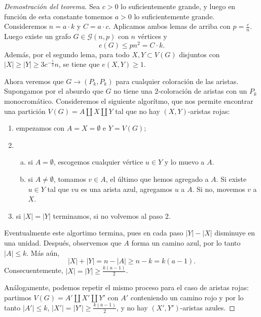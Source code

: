 \documentclass[12pt]{report}
\theoremstyle{plain}
\theoremstyle{definition}
\newcommand{\abs}[1]{\left \vert #1 \right \vert}
\begin{document}
\begin{proof}[Demostración del teorema]
Sea $c > 0$ lo suficientemente grande, y luego en función de esta constante tomemos $a>0$ lo suficientemente grande. Consideremos $n = a \cdot k$ y $C = a \cdot c$. Aplicamos ambos lemas de arriba con $p = \frac c n$. Luego existe un grafo $G \in \mathcal G (n,p)$ con $n$ vértices y
\[
    e(G) \leq pn^2 = C \cdot k  .
\]
Además, por el segundo lema, para todo $X,Y \subset V(G)$ disjuntos con $\abs X \geq \abs Y \geq 3 c^{- \frac 1 2}n$, se tiene que $e(X,Y) \geq 1$.

Ahora veremos que $G \longrightarrow (P_k, P_k)$ para cualquier coloración de las aristas. Supongamos por el absurdo que $G$ no tiene una $2$-coloración de aristas con un $P_k$ monocromático. Consideremos el siguiente algorítmo, que nos permite encontrar una partición $V(G) = A \coprod X \coprod Y$ tal que no hay $(X,Y)$-aristas rojas:
\begin{enumerate}
\item empezamos con $A = X = \emptyset$ e $Y = V(G)$;
\item
\begin{enumerate}[(a)]
\item si $A = \emptyset$, escogemos cualquier vértice $u \in Y$ y lo muevo a $A$.
\item si $A \neq \emptyset$, tomamos $v \in A$, el último que hemos agregado a $A$. Si existe $u \in Y$ tal que $v u$ es una arista azul, agregamos $u$ a $A$. Si no, movemos $v$ a $X$.
\end{enumerate}
\item si $\abs X = \abs Y$ terminamos, si no volvemos al paso 2.
\end{enumerate}

Eventualmente este algortimo termina, pues en cada paso $\abs Y - \abs X$ disminuye en una unidad. Después, observemos que $A$ forma un camino azul, por lo tanto $\abs A \leq k$. Más aún,
\[
    \abs X + \abs Y = n - \abs A \geq n - k = k (a-1).
\]
Consecuentemente, $\abs X = \abs Y \geq \frac {k (a-1)}{2}$.

Análogamente, podemos repetir el mismo proceso para el caso de aristas rojas: partimos $V(G) = A' \coprod X' \coprod Y'$ con $A'$ conteniendo un camino rojo y por lo tanto $\abs {A'} \leq k$, $\abs{X'} = \abs{Y'} \geq \frac{k(a-1)}{2}$, y no hay $(X',Y')$-aristas azules.


\end{proof}
\end{document}
